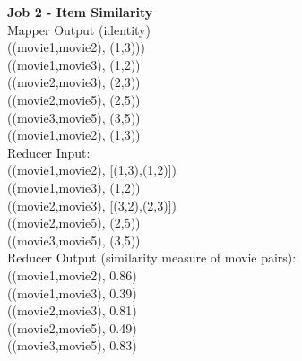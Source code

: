 \documentclass{article}
\begin{document}
\begin{itemize}
\begin{itemize}
			\textbf{Job 2 - Item Similarity}\\
			Mapper Output (identity)\\
			((movie1,movie2), (1,3)))\\
			((movie1,movie3), (1,2))\\
			((movie2,movie3), (2,3))\\
			((movie2,movie5), (2,5))\\
			((movie3,movie5), (3,5))\\
			((movie1,movie2), (1,3))\\
			  
			Reducer Input:\\
			((movie1,movie2), [(1,3),(1,2)])\\ 
			((movie1,movie3), (1,2))\\
			((movie2,movie3), [(3,2),(2,3)])\\
			((movie2,movie5), (2,5))\\
			((movie3,movie5), (3,5))\\
			
			Reducer Output (similarity measure of movie pairs):\\
			((movie1,movie2), 0.86)\\
			((movie1,movie3), 0.39)\\
			((movie2,movie3), 0.81)\\
			((movie2,movie5), 0.49)\\
			((movie3,movie5), 0.83)\\
			
	\end{itemize}
	
\end{itemize}
\end{document}
